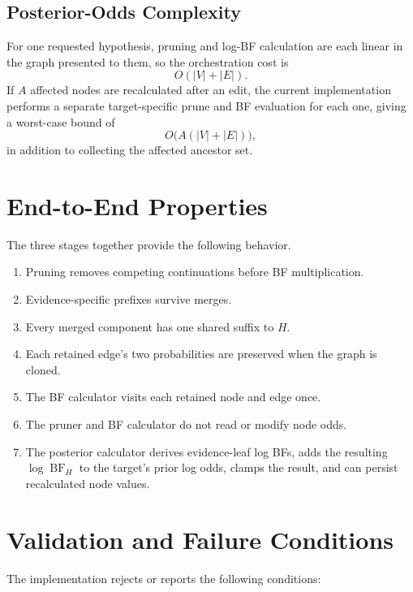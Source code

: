 \documentclass[11pt]{article}
\newcommand{\BF}{\operatorname{BF}}
\begin{document}
\subsection{Posterior-Odds Complexity}

For one requested hypothesis, pruning and log-BF calculation are each linear
in the graph presented to them, so the orchestration cost is
\[
    O(|V|+|E|).
\]
If \(A\) affected nodes are recalculated after an edit, the current
implementation performs a separate target-specific prune and BF evaluation
for each one, giving a worst-case bound of
\[
    O\bigl(A(|V|+|E|)\bigr),
\]
in addition to collecting the affected ancestor set.

\section{End-to-End Properties}

The three stages together provide the following behavior.

\begin{enumerate}
    \item Pruning removes competing continuations before BF multiplication.
    \item Evidence-specific prefixes survive merges.
    \item Every merged component has one shared suffix to \(H\).
    \item Each retained edge's two probabilities are preserved when the graph
          is cloned.
    \item The BF calculator visits each retained node and edge once.
    \item The pruner and BF calculator do not read or modify node odds.
    \item The posterior calculator derives evidence-leaf log BFs, adds the
          resulting \(\log\BF_H\) to the target's prior log odds, clamps the
          result, and can persist recalculated node values.
\end{enumerate}

\section{Validation and Failure Conditions}

The implementation rejects or reports the following conditions:
\end{document}
